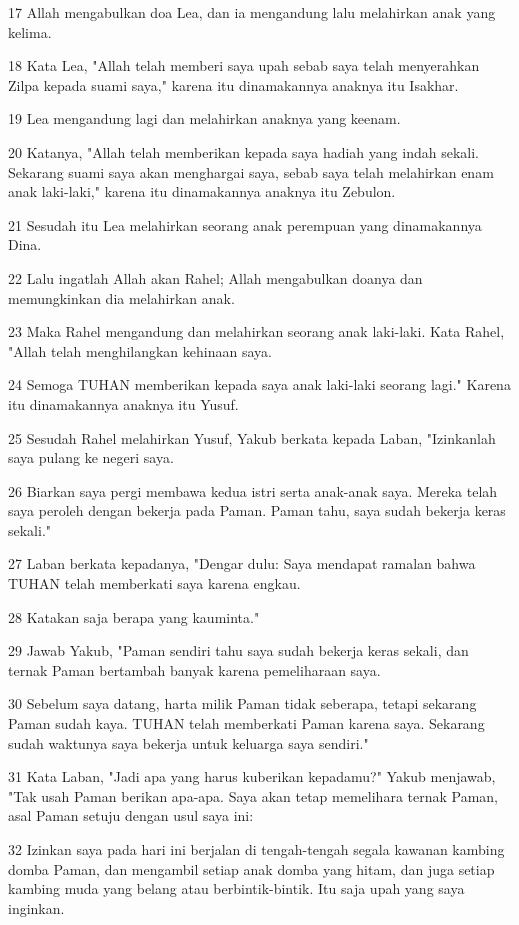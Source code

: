 \par 17 Allah mengabulkan doa Lea, dan ia mengandung lalu melahirkan anak yang kelima.
\par 18 Kata Lea, "Allah telah memberi saya upah sebab saya telah menyerahkan Zilpa kepada suami saya," karena itu dinamakannya anaknya itu Isakhar.
\par 19 Lea mengandung lagi dan melahirkan anaknya yang keenam.
\par 20 Katanya, "Allah telah memberikan kepada saya hadiah yang indah sekali. Sekarang suami saya akan menghargai saya, sebab saya telah melahirkan enam anak laki-laki," karena itu dinamakannya anaknya itu Zebulon.
\par 21 Sesudah itu Lea melahirkan seorang anak perempuan yang dinamakannya Dina.
\par 22 Lalu ingatlah Allah akan Rahel; Allah mengabulkan doanya dan memungkinkan dia melahirkan anak.
\par 23 Maka Rahel mengandung dan melahirkan seorang anak laki-laki. Kata Rahel, "Allah telah menghilangkan kehinaan saya.
\par 24 Semoga TUHAN memberikan kepada saya anak laki-laki seorang lagi." Karena itu dinamakannya anaknya itu Yusuf.
\par 25 Sesudah Rahel melahirkan Yusuf, Yakub berkata kepada Laban, "Izinkanlah saya pulang ke negeri saya.
\par 26 Biarkan saya pergi membawa kedua istri serta anak-anak saya. Mereka telah saya peroleh dengan bekerja pada Paman. Paman tahu, saya sudah bekerja keras sekali."
\par 27 Laban berkata kepadanya, "Dengar dulu: Saya mendapat ramalan bahwa TUHAN telah memberkati saya karena engkau.
\par 28 Katakan saja berapa yang kauminta."
\par 29 Jawab Yakub, "Paman sendiri tahu saya sudah bekerja keras sekali, dan ternak Paman bertambah banyak karena pemeliharaan saya.
\par 30 Sebelum saya datang, harta milik Paman tidak seberapa, tetapi sekarang Paman sudah kaya. TUHAN telah memberkati Paman karena saya. Sekarang sudah waktunya saya bekerja untuk keluarga saya sendiri."
\par 31 Kata Laban, "Jadi apa yang harus kuberikan kepadamu?" Yakub menjawab, "Tak usah Paman berikan apa-apa. Saya akan tetap memelihara ternak Paman, asal Paman setuju dengan usul saya ini:
\par 32 Izinkan saya pada hari ini berjalan di tengah-tengah segala kawanan kambing domba Paman, dan mengambil setiap anak domba yang hitam, dan juga setiap kambing muda yang belang atau berbintik-bintik. Itu saja upah yang saya inginkan.
